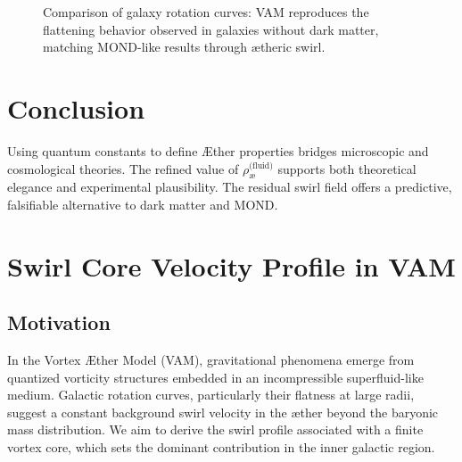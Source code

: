 \documentclass[12pt]{article}
\begin{document}
    \begin{figure}[h]
        \centering
        \caption{Comparison of galaxy rotation curves: VAM reproduces the flattening behavior observed in galaxies without dark matter, matching MOND-like results through ætheric swirl.}
    \end{figure}


    \section{Conclusion}

    Using quantum constants to define \AE{}ther properties bridges microscopic and cosmological theories. The refined value of $\rho_{\text{\ae}}^{\text{(fluid)}}$ supports both theoretical elegance and experimental plausibility. The residual swirl field offers a predictive, falsifiable alternative to dark matter and MOND.


\section{Swirl Core Velocity Profile in VAM}
\label{appendix:swirl-core}

\subsection{Motivation}

In the Vortex \AE{}ther Model (VAM), gravitational phenomena emerge from quantized vorticity structures embedded in an incompressible superfluid-like medium. Galactic rotation curves, particularly their flatness at large radii, suggest a constant background swirl velocity in the æther beyond the baryonic mass distribution. We aim to derive the swirl profile associated with a finite vortex core, which sets the dominant contribution in the inner galactic region.
\end{document}
